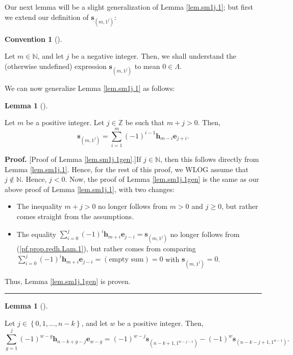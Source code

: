 \documentclass[numbers=enddot,12pt,final,onecolumn,notitlepage]{scrartcl}%
\theoremstyle{definition}
\newtheorem{lem}[theo]{Lemma}
\newenvironment{lemma}[1][]
{\begin{lem}[#1]\begin{leftbar}}
{\end{leftbar}\end{lem}}
\newtheorem{conv}[theo]{Convention}
\newenvironment{convention}[1][]
{\begin{conv}[#1]\begin{leftbar}}
{\end{leftbar}\end{conv}}
\newenvironment{proof}[1][Proof]{\noindent\textbf{#1.} }{\ \rule{0.5em}{0.5em}}
\newenvironment{convention}[1][Convention]{\noindent\textbf{#1.} }{\ \rule{0.5em}{0.5em}}
\newenvironment{convention}[1][Convention]{\noindent\textbf{#1.} }{\ \rule{0.5em}{0.5em}}
\let\sumnonlimits\sum
\renewcommand{\sum}{\sumnonlimits\limits}
\begin{document}
Our next lemma will be a slight generalization of Lemma \ref{lem.sm1j.1}; but
first we extend our definition of $\mathbf{s}_{\left(  m,1^{j}\right)  }$:

\begin{convention}
\label{conv.sm1j.jneg}Let $m\in\mathbb{N}$, and let $j$ be a negative integer.
Then, we shall understand the (otherwise undefined) expression $\mathbf{s}%
_{\left(  m,1^{j}\right)  }$ to mean $0\in\Lambda$.
\end{convention}

We can now generalize Lemma \ref{lem.sm1j.1} as follows:

\begin{lemma}
\label{lem.sm1j.1gen}Let $m$ be a positive integer. Let $j\in\mathbb{Z}$ be
such that $m+j>0$. Then,%
\[
\mathbf{s}_{\left(  m,1^{j}\right)  }=\sum_{i=1}^{m}\left(  -1\right)
^{i-1}\mathbf{h}_{m-i}\mathbf{e}_{j+i}.
\]

\end{lemma}

\begin{proof}
[Proof of Lemma \ref{lem.sm1j.1gen}.]If $j\in\mathbb{N}$, then this follows
directly from Lemma \ref{lem.sm1j.1}. Hence, for the rest of this proof, we
WLOG assume that $j\notin\mathbb{N}$. Hence, $j<0$. Now, the proof of Lemma
\ref{lem.sm1j.1gen} is the same as our above proof of Lemma \ref{lem.sm1j.1},
with two changes:

\begin{itemize}
\item The inequality $m+j>0$ no longer follows from $m>0$ and $j\geq0$, but
rather comes straight from the assumptions.

\item The equality $\sum_{i=0}^{j}\left(  -1\right)  ^{i}\mathbf{h}%
_{m+i}\mathbf{e}_{j-i}=\mathbf{s}_{\left(  m,1^{j}\right)  }$ no longer
follows from (\ref{pf.prop.redh.Lam.1}), but rather comes from comparing
$\sum_{i=0}^{j}\left(  -1\right)  ^{i}\mathbf{h}_{m+i}\mathbf{e}_{j-i}=\left(
\text{empty sum}\right)  =0$ with $\mathbf{s}_{\left(  m,1^{j}\right)  }=0$.
\end{itemize}

Thus, Lemma \ref{lem.sm1j.1gen} is proven.
\end{proof}

\begin{lemma}
\label{lem.pieri-hall.Lam2}Let $j\in\left\{  0,1,\ldots,n-k\right\}  $, and
let $w$ be a positive integer. Then,%
\[
\sum_{g=1}^{j}\left(  -1\right)  ^{w-g}\mathbf{h}_{n-k+g-j}\mathbf{e}%
_{w-g}=\left(  -1\right)  ^{w-j}\mathbf{s}_{\left(  n-k+1,1^{w-j-1}\right)
}-\left(  -1\right)  ^{w}\mathbf{s}_{\left(  n-k-j+1,1^{w-1}\right)  }.
\]

\end{lemma}
\end{document}
